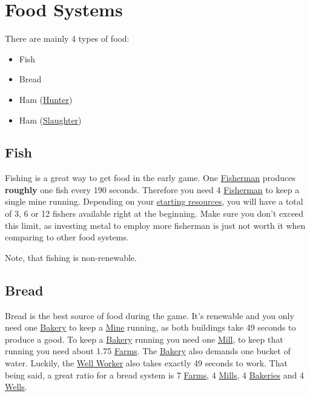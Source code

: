 \documentclass[12pt]{article}
\begin{document}
\section{Food Systems}
\label{sec:foodsystems}

There are mainly 4 types of food:

\begin{itemize}
  \item Fish
  \item Bread
  \item Ham (\hyperref[sec:hunter]{Hunter})
  \item Ham (\hyperref[sec:slaughterhouse]{Slaughter})
\end{itemize}

\subsection{Fish}
\label{sec:fish}

Fishing is a great way to get food in the early game. One \hyperref[sec:fisherman]{Fisherman} produces \textbf{roughly} one fish every 190 seconds. Therefore you need 4 \hyperref[sec:fisherman]{Fisherman} to keep a single mine running. Depending on your \hyperref[sec:startresources]{starting resources}, you will have a total of 3, 6 or 12 fishers available right at the beginning. Make sure you don't exceed this limit, as investing metal to employ more fisherman is just not worth it when comparing to other food systems.

Note, that fishing is non-renewable.

\subsection{Bread}
\label{sec:bread}

Bread is the best source of food during the game. It's renewable and you only need one \hyperref[sec:bakery]{Bakery} to keep a \hyperref[sec:mine]{Mine} running, as both buildings take 49 seconds to produce a good. To keep a \hyperref[sec:bakery]{Bakery} running you need one \hyperref[sec:mill]{Mill}, to keep that running you need about 1.75 \hyperref[sec:farm]{Farms}. The \hyperref[sec:bakery]{Bakery} also demands one bucket of water. Luckily, the \hyperref[sec:well]{Well Worker} also takes exactly 49 seconds to work. That being said, a great ratio for a bread system is 7 \hyperref[sec:farm]{Farms}, 4 \hyperref[sec:mill]{Mills}, 4 \hyperref[sec:bakery]{Bakeries} and 4 \hyperref[sec:well]{Wells}.
\end{document}
